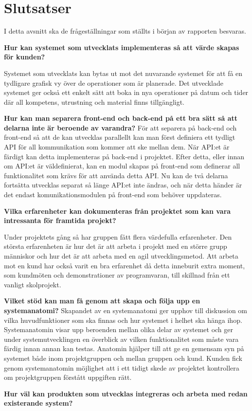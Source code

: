 \chapter{Slutsatser}
I detta avsnitt ska de frågeställningar som ställts i början av rapporten besvaras.

\textbf{Hur kan systemet som utvecklats implementeras så att värde skapas för kunden?}

Systemet som utvecklats kan bytas ut mot det nuvarande systemet för att få en tydligare grafisk vy över de operationer som är planerade. Det utvecklade systemet ger också ett enkelt sätt att boka in nya operationer på datum och tider där all kompetens, utrustning och material finns tillgängligt.

\textbf{Hur kan man separera front-end och back-end på ett bra sätt så att delarna inte är beroende av varandra?}
För att separera på back-end och front-end så att de kan utvecklas parallellt kan man först definiera ett tydligt API för all kommunikation som kommer att ske mellan dem. När API:et är färdigt kan detta implementeras på back-end i projektet. Efter detta, eller innan om API:et är väldefinierat, kan en modul skapas på front-end som definerar all funktionalitet som krävs för att använda detta API. Nu kan de två delarna fortsätta utvecklas separat så länge API:et inte ändras, och när detta händer är det endast komunikationsmodulen på front-end som behöver uppdateras.

\textbf{Vilka erfarenheter kan dokumenteras från projektet som kan vara intressanta för framtida projekt?}

Under projektets gång så har gruppen fått flera värdefulla erfarenheter. Den största erfarenheten är hur det är att arbeta i projekt med en större grupp människor och hur det är att arbeta med en agil utvecklingsmetod. Att arbeta mot en kund har också varit en bra erfarenhet då detta inneburit extra moment, som kundmöten och demonstrationer av programvaran, till skillnad från ett vanligt skolprojekt.

\textbf{Vilket stöd kan man få genom att skapa och följa upp en systemanatomi?}
Skapandet av en systemanatomi ger upphov till diskussion om vilka huvudfunktioner som ska finnas och hur systemet i helhet ska hänga ihop. Systemanatomin visar upp beroenden mellan olika delar av systemet och ger under systemutvecklingen en överblick av vilken funktionalitet som måste vara färdig innan annan kan testas. Anatomin hjälper till att ge en gemensam syn på systemet både inom projektgruppen och mellan gruppen och kund. Kunden fick genom systemanatomin möjlighet att i ett tidigt skede av projektet kontrollera om projektgruppen förstått uppgiften rätt.    

\textbf{Hur väl kan produkten som utvecklas integreras och arbeta med redan existerande system?}